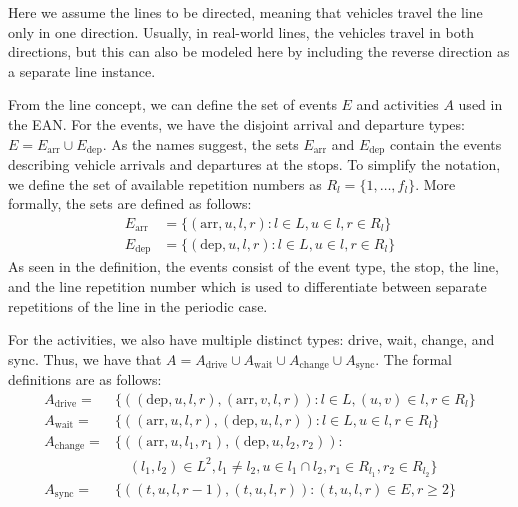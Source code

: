 \documentclass[english, 12pt, a4paper, sci, utf8, a-2b, online]{aaltothesis}
\newtheorem{definition}{Definition}
\newcommand{\Earr}{E_\text{arr}}
\newcommand{\Edep}{E_\text{dep}}
\newcommand{\Async}{A_\text{sync}}
\begin{document}
Here we assume the lines to be directed, meaning that vehicles travel the line only in one direction. Usually, in real-world lines, the vehicles travel in both directions, but this can also be modeled here by including the reverse direction as a separate line instance. %

From the line concept, we can define the set of events $E$ and activities $A$ used in the EAN.
For the events, we have the disjoint arrival and departure types: $E = \Earr \cup \Edep$. As the names suggest, the sets $\Earr$ and $\Edep$ contain the events describing vehicle arrivals and departures at the stops. To simplify the notation, we define the set of available repetition numbers as $R_l = \{1, \dots, f_l\}$. More formally, the sets are defined as follows:
\begin{align*}
    \Earr &= \{
        (\text{arr}, u, l, r) : l \in L, u \in l, r \in R_l
    \} \\
    \Edep &= \{
        (\text{dep}, u, l, r) : l \in L, u \in l, r \in R_l
    \}
\end{align*}
As seen in the definition, the events consist of the event type, the stop, the line, and the line repetition number which is used to differentiate between separate repetitions of the line in the periodic case.

For the activities, we also have multiple distinct types: drive, wait, change, and sync. Thus, we have that $A = A_\text{drive} \cup A_\text{wait} \cup A_\text{change} \cup \Async$. The formal definitions are as follows:
\begin{align*}
    A_\text{drive} =& \{(
        (\text{dep}, u, l, r),
        (\text{arr}, v, l, r)
    ): l \in L, (u, v) \in l, r \in R_l\}\\
    A_\text{wait} =& \{(
        (\text{arr}, u, l, r),
        (\text{dep}, u, l, r)
    ): l \in L, u \in l, r \in R_l\} \\
    A_\text{change} =& \{(
        (\text{arr}, u, l_1, r_1),
        (\text{dep}, u, l_2, r_2)
    ): \\&\quad (l_1, l_2) \in L^2, l_1 \neq l_2, u \in l_1 \cap l_2, r_1 \in R_{l_1}, r_2 \in R_{l_2}\} \\
    \Async =& \{(
       (t, u, l, r-1),
       (t, u, l, r)
    ): (t, u, l, r) \in E, r \geq 2 \}
\end{align*}
\end{document}
